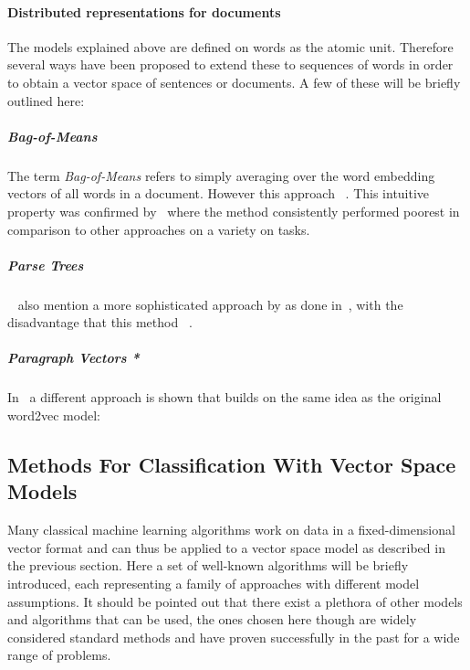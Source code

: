 \paragraph{Distributed representations for documents}
\label{par:Distributed representations for documents}

The models explained above are defined on words as the atomic unit. Therefore several ways have been proposed to extend these to sequences of words in order to obtain a vector space of sentences or documents. A few of these will be briefly outlined here:

\subparagraph{Bag-of-Means}
\label{subp:Bag-of-Means}
The term \emph{Bag-of-Means} refers to simply averaging over the word embedding vectors of all words in a document. However this approach ~\cite{Le:2014aa}. This intuitive property was confirmed by~\cite{Zhang:2015aa} where the method consistently performed poorest in comparison to other approaches on a variety on tasks.

\subparagraph{Parse Trees}~\cite{Le:2014aa} also mention a more sophisticated approach by  as done in~\cite{Socher:2011aa}, with the disadvantage that this method ~\cite{Le:2014aa}.

\subparagraph{Paragraph Vectors *}
In~\cite{Le:2014aa} a different approach is shown that builds on the same idea as the original word2vec model:

\subsection{Methods For Classification With Vector Space Models}
\label{sub:Methods For Classification With Vector Space Models}

Many classical machine learning algorithms work on data in a fixed-dimensional vector format and can thus be applied to a vector space model as described in the previous section. Here a set of well-known algorithms will be briefly introduced, each representing a family of approaches with different model assumptions. It should be pointed out that there exist a plethora of other models and algorithms that can be used, the ones chosen here though are widely considered standard methods and have proven successfully in the past for a wide range of problems.


